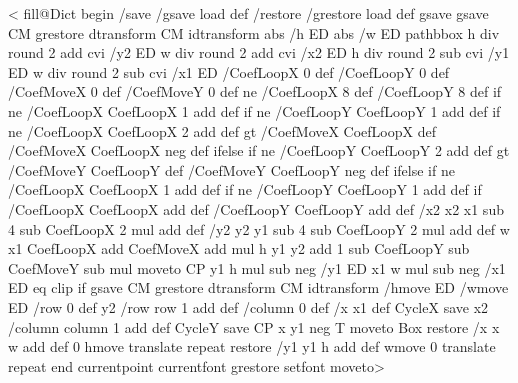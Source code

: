 <
  \ifPSTlualatex
    fill@Dict begin
    /save /gsave load def
    /restore /grestore load def
  \fi
  gsave
    gsave \tx@STV CM grestore dtransform CM idtransform
    abs /h ED abs /w ED
    pathbbox 
    h div round 2 add cvi /y2 ED
    w div round 2 add cvi /x2 ED
    h div round 2 sub cvi /y1 ED
    w div round 2 sub cvi /x1 ED
    /CoefLoopX 0 def
    /CoefLoopY 0 def
    /CoefMoveX 0 def
    /CoefMoveY 0 def
    \psk@boxfillangle{} ne {/CoefLoopX 8 def /CoefLoopY 8 def} if
    \psk@fillcyclex{} ne {/CoefLoopX CoefLoopX 1 add def} if
    \psk@fillcycley{} ne {/CoefLoopY CoefLoopY 1 add def} if
    \psk@fillmovex{} ne
      {/CoefLoopX CoefLoopX 2 add def
       \psk@fillmovex{} gt {/CoefMoveX CoefLoopX def}
                           {/CoefMoveX CoefLoopX neg def} ifelse} if
    \psk@fillmovey{} ne
      {/CoefLoopY CoefLoopY 2 add def
       \psk@fillmovey{} gt {/CoefMoveY CoefLoopY def}
                           {/CoefMoveY CoefLoopY neg def} ifelse} if
    \psk@fillsepx{} ne {/CoefLoopX CoefLoopX 1 add def} if
    \psk@fillsepy{} ne {/CoefLoopY CoefLoopY 1 add def} if
    /CoefLoopX CoefLoopX \psk@fillloopaddx\space add def
    /CoefLoopY CoefLoopY \psk@fillloopaddy\space add def
    /x2 x2 x1 sub 4 sub CoefLoopX 2 mul add def
    /y2 y2 y1 sub 4 sub CoefLoopY 2 mul add def
    w x1 CoefLoopX add CoefMoveX add mul
      h y1 y2 add 1 sub CoefLoopY sub CoefMoveY sub mul moveto
    CP
    y1 h mul sub neg /y1 ED
    x1 w mul sub neg /x1 ED
     eq {clip} if
    \psk@fillmovex\space \psk@fillmovey
    gsave \tx@STV CM grestore dtransform CM idtransform
    /hmove ED /wmove ED
    /row 0 def
   y2 {
       /row row 1 add def
       /column 0 def
       /x x1 def
       CycleX
       save
       x2 {
          /column column 1 add def
          CycleY
          save CP x y1 
          \ifx\VTeXversion\undefined
          \else
          neg
          \fi
          T moveto Box restore
          /x x w add def
          0 hmove translate
          } repeat
       restore
       /y1 y1 h add def
       wmove 0 translate
       } repeat
  \ifPSTlualatex end \fi
  currentpoint currentfont grestore setfont moveto>
\fi

